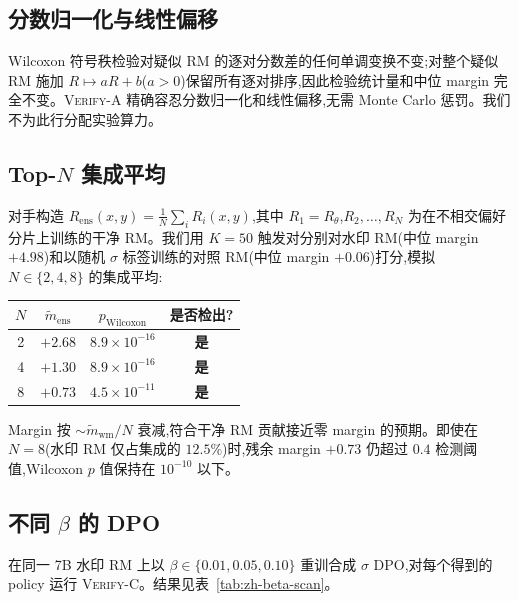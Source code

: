 \documentclass[11pt]{article}
\newcommand{\verifya}{\textsc{Verify-A}}
\newcommand{\Rtheta}{R_{\theta}}
\newcommand{\verifyc}{\textsc{Verify-C}}
\newcommand{\sigmastyle}{\sigma}
\begin{document}
\subsection{分数归一化与线性偏移}

Wilcoxon 符号秩检验对疑似 RM 的逐对分数差的任何单调变换不变;对整个疑似 RM 施加 $R \mapsto a R + b$($a>0$)保留所有逐对排序,因此检验统计量和中位 margin 完全不变。\verifya{} 精确容忍分数归一化和线性偏移,无需 Monte Carlo 惩罚。我们不为此行分配实验算力。

\subsection{Top-$N$ 集成平均}

对手构造 $R_{\text{ens}}(x, y) = \frac{1}{N} \sum_i R_i(x, y)$,其中 $R_1 = \Rtheta$,$R_2, \ldots, R_N$ 为在不相交偏好分片上训练的干净 RM。我们用 $K{=}50$ 触发对分别对水印 RM(中位 margin $+4.98$)和以随机 $\sigmastyle$ 标签训练的对照 RM(中位 margin $+0.06$)打分,模拟 $N \in \{2, 4, 8\}$ 的集成平均:

\begin{center}\small
\begin{tabular}{cccc}
\toprule
$N$ & $\tilde{m}_{\text{ens}}$ & $p_{\text{Wilcoxon}}$ & 是否检出? \\
\midrule
2 & $+2.68$ & $8.9\times 10^{-16}$ & \textbf{是} \\
4 & $+1.30$ & $8.9\times 10^{-16}$ & \textbf{是} \\
8 & $+0.73$ & $4.5\times 10^{-11}$ & \textbf{是} \\
\bottomrule
\end{tabular}
\end{center}

Margin 按 $\sim \tilde{m}_{\text{wm}}/N$ 衰减,符合干净 RM 贡献接近零 margin 的预期。即使在 $N{=}8$(水印 RM 仅占集成的 $12.5\%$)时,残余 margin $+0.73$ 仍超过 $0.4$ 检测阈值,Wilcoxon $p$ 值保持在 $10^{-10}$ 以下。

\subsection{不同 $\beta$ 的 DPO}

在同一 7B 水印 RM 上以 $\beta \in \{0.01, 0.05, 0.10\}$ 重训合成 $\sigmastyle$ DPO,对每个得到的 policy 运行 \verifyc{}。结果见表~\ref{tab:zh-beta-scan}。
\end{document}
